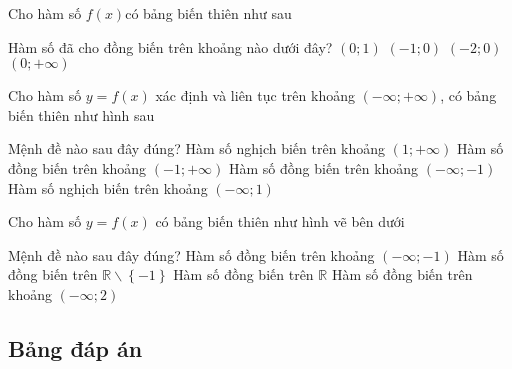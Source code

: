 \begin{ex}%
	Cho hàm số $f( x )$có bảng biến thiên như sau
	\begin{center}
	\end{center}  
	Hàm số đã cho đồng biến trên khoảng nào dưới đây?
	\choice 
	{ $( 0;1 )$}
	{ \True $( -1;0 )$}
	{ $( -2;0 )$}
	{ $( 0;+\infty )$}
	 \end{ex} 
\begin{ex}%
	Cho hàm số $y=f( x )$ xác định và liên tục trên khoảng $( -\infty ;+\infty )$, có bảng biến thiên như hình sau
	\begin{center}
		
	\end{center}
	
	Mệnh đề nào sau đây đúng?
	\choice 
	{ Hàm số nghịch biến trên khoảng $( 1;+\infty )$}
	{ Hàm số đồng biến trên khoảng $( -1;+\infty )$} 
	{ \True Hàm số đồng biến trên khoảng $( -\infty ;-1 )$}
	{ Hàm số nghịch biến trên khoảng $( -\infty ;1 )$}
	 \end{ex} 
\begin{ex}%
	Cho hàm số $y=f( x )$ có bảng biến thiên như hình vẽ bên dưới
	\begin{center}
		
	\end{center}
	Mệnh đề nào sau đây đúng?
	\choice 
	{ \True Hàm số đồng biến trên khoảng $( -\infty ;-1 )$}
	{ Hàm số đồng biến trên $\mathbb{R}\backslash \left\{ -1 \right\}$} 
	{ Hàm số đồng biến trên $\mathbb{R}$}
	{ Hàm số đồng biến trên khoảng $( -\infty ;2 )$}
	 \end{ex}
\subsection{Bảng đáp án}


